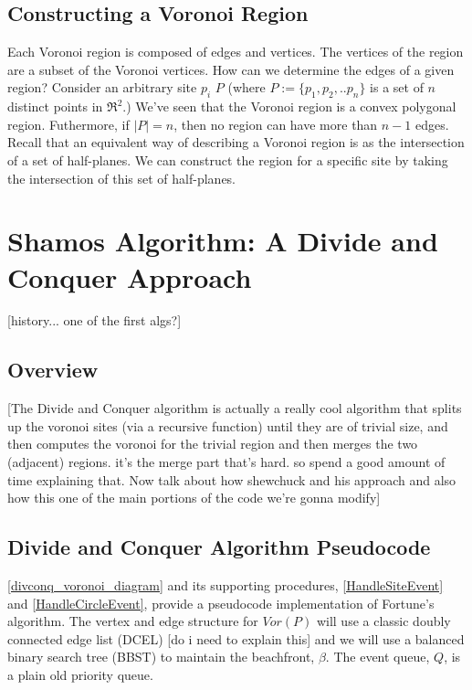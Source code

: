 \documentclass[12pt,twoside]{reedthesis}
\begin{document}
  \subsection{Constructing a Voronoi Region} %
  \label{sub:constructing_a_voronoi_region}
  Each Voronoi region is composed of edges and vertices. The vertices of the region are a subset of the Voronoi vertices. How can we determine the edges of a given region? Consider an arbitrary site $p_{i}$ $P$ (where $P:=\{p_{1}, p_{2}, .. p_{n}\}$ is a set of $n$ distinct points in $\Re^{2}$.) We've seen that the Voronoi region is a convex polygonal region. Futhermore, if $|P| = n$, then no region can have more than $n-1$ edges. Recall that an equivalent way of describing a Voronoi region is as the intersection of a set of half-planes. We can construct the region for a specific site by taking the intersection of this set of half-planes.
  


  \section{Shamos Algorithm: A Divide and Conquer Approach} %
  \label{sec:divide_and_conquer}
  [history... one of the first algs?]
  \subsection{Overview} %
  \label{sub:overview}
  [The Divide and Conquer algorithm is actually a really cool algorithm that splits up the voronoi sites (via a recursive function) until they are of trivial size, and then computes the voronoi for the trivial region and then merges the two (adjacent) regions. it's the merge part that's hard. so spend a good amount of time explaining that. Now talk about how shewchuck and his approach and also how this one of the main portions of the code we're gonna modify]


  \subsection{Divide and Conquer Algorithm Pseudocode} %
  \label{sub:divide_and_conquer_algorithm_pseudocode}
  \cref{divconq_voronoi_diagram} and its supporting procedures, \cref{HandleSiteEvent} and \cref{HandleCircleEvent}, provide a pseudocode implementation of Fortune's algorithm. The vertex and edge structure for $Vor(P)$ will use a classic doubly connected edge list (DCEL) [do i need to explain this] and we will use a balanced binary search tree (BBST) to maintain the beachfront, $\beta$. The event queue, $Q$, is a plain old priority queue. 
  
\end{document}
